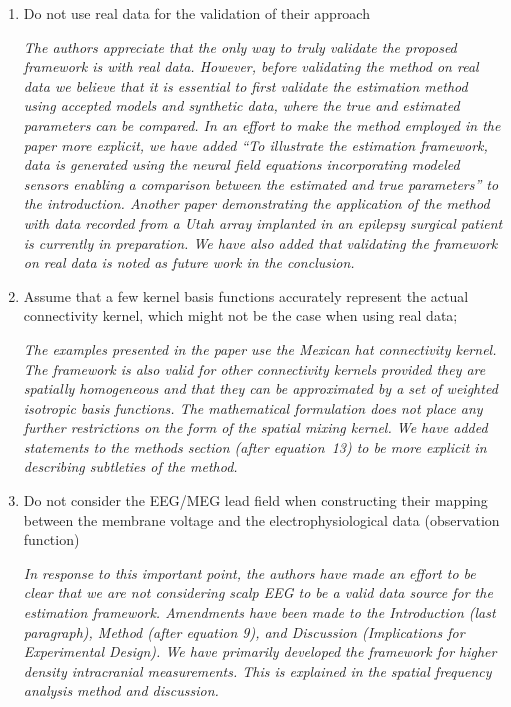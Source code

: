 \documentclass{article}
\begin{document}
    \begin{enumerate}
        \item Do not use real data for the validation of their approach

	\emph{The authors appreciate that the only way to truly validate the proposed framework is with real data. However, before validating the method on real data we believe that it is essential to first validate the estimation method using accepted models and synthetic data, where the true and estimated parameters can be compared. In an effort to make the method employed in the paper more explicit, we have added ``To illustrate the estimation framework, data is generated using the neural field equations incorporating modeled sensors enabling a comparison between the estimated and true parameters'' to the introduction. Another paper demonstrating the application of the method with data recorded from a Utah array implanted in an epilepsy surgical patient is currently in preparation. We have also added that validating the framework on real data is noted as future work in the conclusion.}
	
        \item Assume that a few kernel basis functions accurately represent the actual connectivity kernel, which might not be the case when using real data;

	\emph{The examples presented in the paper use the Mexican hat connectivity kernel. The framework is also valid for other connectivity kernels provided they are spatially homogeneous and that they can be approximated by a set of weighted isotropic basis functions. The mathematical formulation does not place any further restrictions on the form of the spatial mixing kernel. We have added statements to the methods section (after equation~13) to be more explicit in describing subtleties of the method.}

        \item Do not consider the EEG/MEG lead field when constructing their mapping between the membrane voltage and the electrophysiological data (observation function)

	\emph{In response to this important point, the authors have made an effort to be clear that we are not considering scalp EEG to be a valid data source for the estimation framework. Amendments have been made to the Introduction (last paragraph), Method (after equation 9), and Discussion (Implications for Experimental Design). We have primarily developed the framework for higher density intracranial measurements. This is explained in the spatial frequency analysis method and discussion.}
	
    \end{enumerate}
    
\end{document}
